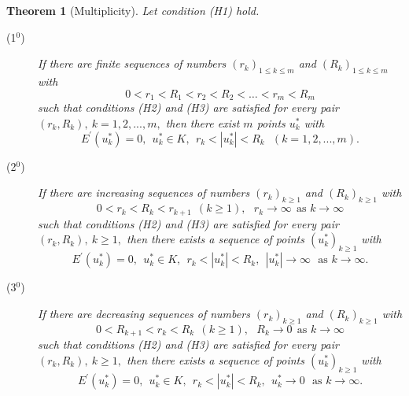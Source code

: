 \documentclass{birkjour}
\newtheorem{theorem}{Theorem}[section]
\theoremstyle{definition}
\theoremstyle{remark}
\numberwithin{equation}{section}
\begin{document}
\begin{theorem}[Multiplicity]
\label{t2}Let condition (H1) hold.

\begin{description}
\item[(1$^{0}$)] If there are finite sequences of numbers $\left(
r_{k}\right) _{1\leq k\leq m}$ and $\left( R_{k}\right) _{1\leq k\leq m}$
with
\begin{equation*}
0<r_{1}<R_{1}<r_{2}<R_{2}<\dots <r_{m}<R_{m}
\end{equation*}%
such that conditions (H2) and (H3) are satisfied for every pair $\left(
r_{k},R_{k}\right) ,\ k=1,2,...,m,$ then there exist $m$ points $u_{k}^{\ast
}$ with%
\begin{equation*}
E^{\prime }\left( u_{k}^{\ast }\right) =0,\ \ u_{k}^{\ast }\in K,\ \
r_{k}<\left\vert u_{k}^{\ast }\right\vert <R_{k}\ \ \ \left(
k=1,2,...,m\right) .
\end{equation*}

\item[(2$^{0}$)] If there are increasing sequences of numbers $\left(
r_{k}\right) _{k\geq 1}$ and $\left( R_{k}\right) _{k\geq 1}$ with%
\begin{equation*}
0<r_{k}<R_{k}<r_{k+1}\ \ \left( k\geq 1\right) ,\ \ \ r_{k}\rightarrow
\infty \ \ \text{as }k\rightarrow \infty
\end{equation*}%
such that conditions (H2) and (H3) are satisfied for every pair $\left(
r_{k},R_{k}\right) ,\ k\geq 1,$ then there exists a sequence of points $%
\left( u_{k}^{\ast }\right) _{k\geq 1}$ with%
\begin{equation*}
E^{\prime }\left( u_{k}^{\ast }\right) =0,\ \ u_{k}^{\ast }\in K,\ \
r_{k}<\left\vert u_{k}^{\ast }\right\vert <R_{k},\ \ \left\vert u_{k}^{\ast
}\right\vert \rightarrow \infty \ \ \ \text{as }k\rightarrow \infty .
\end{equation*}

\item[(3$^{0}$)] If there are decreasing sequences of numbers $\left(
r_{k}\right) _{k\geq 1}$ and $\left( R_{k}\right) _{k\geq 1}$ with%
\begin{equation*}
0<R_{k+1}<r_{k}<R_{k}\ \ \left( k\geq 1\right) ,\ \ \ R_{k}\rightarrow 0\ \
\text{as }k\rightarrow \infty
\end{equation*}%
such that conditions (H2) and (H3) are satisfied for every pair $\left(
r_{k},R_{k}\right) ,\ k\geq 1,$ then there exists a sequence of points $%
\left( u_{k}^{\ast }\right) _{k\geq 1}$ with%
\begin{equation*}
E^{\prime }\left( u_{k}^{\ast }\right) =0,\ \ u_{k}^{\ast }\in K,\ \
r_{k}<\left\vert u_{k}^{\ast }\right\vert <R_{k},\ \ u_{k}^{\ast
}\rightarrow 0\ \ \ \text{as }k\rightarrow \infty .
\end{equation*}
\end{description}
\end{theorem}
\end{document}
